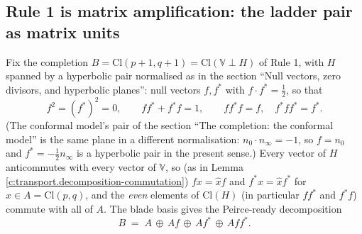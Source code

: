 \documentclass[11pt]{article}
\theoremstyle{definition}
\theoremstyle{plain}
\providecommand{\Cl}{}\renewcommand{\Cl}{\mathrm{Cl}}
\providecommand{\nInf}{}\renewcommand{\nInf}{n_\infty}
\providecommand{\nO}{}\renewcommand{\nO}{n_0}
\begin{document}
\subsection*{Rule 1 is matrix amplification: the ladder pair as matrix units}
\label{c:note.transport.setting-rule-1-matrix-amplification-ladder}
Fix the completion $B = \Cl(p{+}1, q{+}1) = \Cl(\mathbb{V} \perp H)$ of Rule 1, with $H$ spanned by a hyperbolic pair normalised as in the section ``Null vectors, zero divisors, and hyperbolic planes'': null vectors $f, f^*$ with $f \cdot f^* = \tfrac12$, so that
\[
f^2 = (f^*)^2 = 0, \qquad ff^* + f^*f = 1, \qquad ff^*f = f, \quad f^*ff^* = f^* .
\]
(The conformal model's pair of the section ``The completion: the conformal model'' is the same plane in a different normalisation: $\nO \cdot \nInf = -1$, so $f = \nO$ and $f^* = -\tfrac12\nInf$ is a hyperbolic pair in the present sense.) Every vector of $H$ anticommutes with every vector of $\mathbb{V}$, so (as in Lemma \ref{c:transport.decomposition-commutation}) $f x = \hat{x} f$ and $f^* x = \hat{x} f^*$ for $x \in A = \Cl(p,q)$, and the \emph{even} elements of $\Cl(H)$ (in particular $ff^*$ and $f^*f$) commute with all of $A$. The blade basis gives the Peirce-ready decomposition
\[
B \;=\; A \,\oplus\, Af \,\oplus\, Af^* \,\oplus\, Aff^* .
\]
\end{document}
